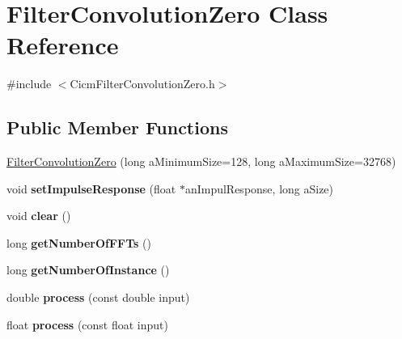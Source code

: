 \hypertarget{class_filter_convolution_zero}{\section{Filter\-Convolution\-Zero Class Reference}
\label{class_filter_convolution_zero}
}


{\ttfamily \#include $<$Cicm\-Filter\-Convolution\-Zero.\-h$>$}

\subsection*{Public Member Functions}
\begin{DoxyCompactItemize}
\item 
\hyperlink{class_filter_convolution_zero_ad8b99b17449c1f06f63679ff0f0f9daf}{Filter\-Convolution\-Zero} (long a\-Minimum\-Size=128, long a\-Maximum\-Size=32768)
\item 
\hypertarget{class_filter_convolution_zero_a8beb3fe66957237230d49bf0c29c7a6a}{void {\bfseries set\-Impulse\-Response} (float $\ast$an\-Impul\-Response, long a\-Size)}\label{class_filter_convolution_zero_a8beb3fe66957237230d49bf0c29c7a6a}

\item 
\hypertarget{class_filter_convolution_zero_a99587aba1900a8321fc8dce7bc9f1c61}{void {\bfseries clear} ()}\label{class_filter_convolution_zero_a99587aba1900a8321fc8dce7bc9f1c61}

\item 
\hypertarget{class_filter_convolution_zero_a5ac3b6f34c2abf7d74547f5a49b349d8}{long {\bfseries get\-Number\-Of\-F\-F\-Ts} ()}\label{class_filter_convolution_zero_a5ac3b6f34c2abf7d74547f5a49b349d8}

\item 
\hypertarget{class_filter_convolution_zero_a17f92e18bd1f8bd10a5efc7bc6c1510c}{long {\bfseries get\-Number\-Of\-Instance} ()}\label{class_filter_convolution_zero_a17f92e18bd1f8bd10a5efc7bc6c1510c}

\item 
\hypertarget{class_filter_convolution_zero_a96938a69a33f3a9c85f3c2ce21e7e40f}{double {\bfseries process} (const double input)}\label{class_filter_convolution_zero_a96938a69a33f3a9c85f3c2ce21e7e40f}

\item 
\hypertarget{class_filter_convolution_zero_a8a6f23806e836d06ef8aaa4aebaded38}{float {\bfseries process} (const float input)}\label{class_filter_convolution_zero_a8a6f23806e836d06ef8aaa4aebaded38}

\end{DoxyCompactItemize}
